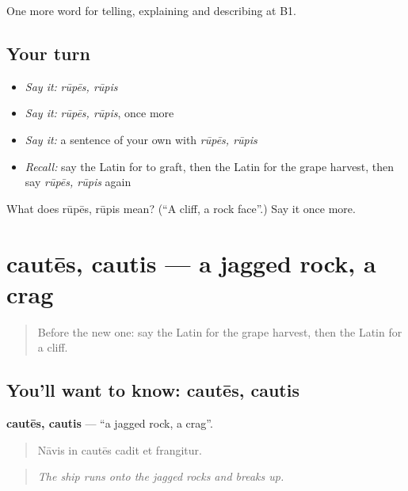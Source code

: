 \begin{grammarlens}[title={What you've built}]
One more word for telling, explaining and describing at B1.
\end{grammarlens}

\subsection*{Your turn}
\begin{itemize}
\raggedright
  \item \emph{Say it:} \emph{rūpēs, rūpis}
  \item \emph{Say it:} \emph{rūpēs, rūpis}, once more
  \item \emph{Say it:} a sentence of your own with \emph{rūpēs, rūpis}
  \item \emph{Recall:} say the Latin for to graft, then the Latin for the grape harvest, then say \emph{rūpēs, rūpis} again
\end{itemize}

\begin{tcolorbox}[breakable,colback=teal!4,colframe=teal!35!black,title={Before you move on}]
What does rūpēs, rūpis mean? (\textquotedblleft{}A cliff, a rock face\textquotedblright{}.) Say it once more.
\end{tcolorbox}
\section[cautēs, cautis]{cautēs, cautis — a jagged rock, a crag}

\label{lesson:LA-C480-cautes}



\begin{quote}
Before the new one: say the Latin for the grape harvest, then the Latin for a cliff.
\end{quote}

\subsection*{You'll want to know: cautēs, cautis}
\textbf{cautēs, cautis} — \textquotedblleft{}a jagged rock, a crag\textquotedblright{}.

\begin{quote}
Nāvis in cautēs cadit et frangitur.
\end{quote}

\begin{quote}
\emph{The ship runs onto the jagged rocks and breaks up.}
\end{quote}

